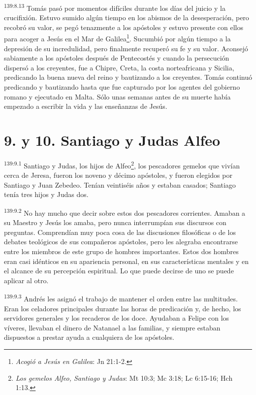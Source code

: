 \par 
\textsuperscript{139:8.13} Tomás pasó por momentos difíciles durante los días del juicio y la crucifixión. Estuvo sumido algún tiempo en los abismos de la desesperación, pero recobró su valor, se pegó tenazmente a los apóstoles y estuvo presente con ellos para acoger a Jesús en el Mar de Galilea\footnote{\textit{Acogió a Jesús en Galilea}: Jn 21:1-2.}. Sucumbió por algún tiempo a la depresión de su incredulidad, pero finalmente recuperó su fe y su valor. Aconsejó sabiamente a los apóstoles después de Pentecostés y cuando la persecución dispersó a los creyentes, fue a Chipre, Creta, la costa norteafricana y Sicilia, predicando la buena nueva del reino y bautizando a los creyentes. Tomás continuó predicando y bautizando hasta que fue capturado por los agentes del gobierno romano y ejecutado en Malta. Sólo unas semanas antes de su muerte había empezado a escribir la vida y las enseñanzas de Jesús.

\section*{9. y 10. Santiago y Judas Alfeo}
\par 
\textsuperscript{139:9.1} Santiago y Judas, los hijos de Alfeo\footnote{\textit{Los gemelos Alfeo, Santiago y Judas}: Mt 10:3; Mc 3:18; Lc 6:15-16; Hch 1:13.}, los pescadores gemelos que vivían cerca de Jeresa, fueron los noveno y décimo apóstoles, y fueron elegidos por Santiago y Juan Zebedeo. Tenían veintiséis años y estaban casados; Santiago tenía tres hijos y Judas dos.

\par 
\textsuperscript{139:9.2} No hay mucho que decir sobre estos dos pescadores corrientes. Amaban a su Maestro y Jesús los amaba, pero nunca interrumpían sus discursos con preguntas. Comprendían muy poca cosa de las discusiones filosóficas o de los debates teológicos de sus compañeros apóstoles, pero les alegraba encontrarse entre los miembros de este grupo de hombres importantes. Estos dos hombres eran casi idénticos en su apariencia personal, en sus características mentales y en el alcance de su percepción espiritual. Lo que puede decirse de uno se puede aplicar al otro.

\par 
\textsuperscript{139:9.3} Andrés les asignó el trabajo de mantener el orden entre las multitudes. Eran los celadores principales durante las horas de predicación y, de hecho, los servidores generales y los recaderos de los doce. Ayudaban a Felipe con los víveres, llevaban el dinero de Natanael a las familias, y siempre estaban dispuestos a prestar ayuda a cualquiera de los apóstoles.

